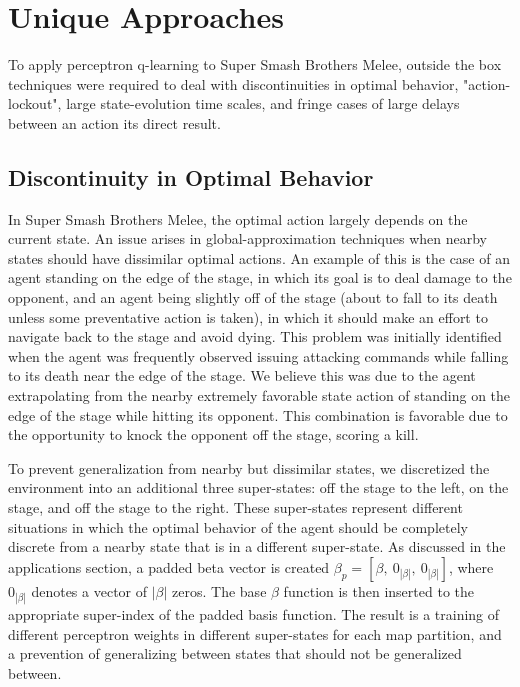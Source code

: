 \section{Unique Approaches}

To apply perceptron q-learning to Super Smash Brothers Melee, outside the box techniques were required to deal with discontinuities in optimal behavior, "action-lockout", large state-evolution time scales, and fringe cases of large delays between an action its direct result.

\subsection{Discontinuity in Optimal Behavior}
In Super Smash Brothers Melee, the optimal action largely depends on the current state. An issue arises in global-approximation techniques when nearby states should have dissimilar optimal actions. An example of this is the case of an agent standing on the edge of the stage, in which its goal is to deal damage to the opponent, and an agent being slightly off of the stage (about to fall to its death unless some preventative action is taken), in which it should make an effort to navigate back to the stage and avoid dying. This problem was initially identified when the agent was frequently observed issuing attacking commands while falling to its death near the edge of the stage. We believe this was due to the agent extrapolating from the nearby extremely favorable state action of standing on the edge of the stage while hitting its opponent. This combination is favorable due to the opportunity to knock the opponent off the stage, scoring a kill.

To prevent generalization from nearby but dissimilar states, we discretized the environment into an additional three super-states: off the stage to the left, on the stage, and off the stage to the right. These super-states represent different situations in which the optimal behavior of the agent should be completely discrete from a nearby state that is in a different super-state. As discussed in the applications section, a padded beta vector is created $\beta_{p} = [\beta,~0_{|\beta|},~0_{|\beta|}]$, where $0_{|\beta|}$ denotes a vector of $|\beta|$ zeros. The base $\beta$ function is then inserted to the appropriate super-index of the padded basis function. The result is a training of different perceptron weights in different super-states for each map partition, and a prevention of generalizing between states that should not be generalized between. 


